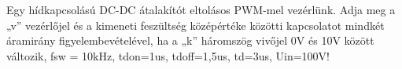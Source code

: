 \begin{example}

Egy hídkapcsolású DC-DC átalakítót eltolásos PWM-mel vezérlünk. Adja meg a „v” vezérlőjel és a kimeneti feszültség középértéke közötti kapcsolatot mindkét áramirány figyelembevételével, ha a „k” háromszög vivőjel 0V és 10V között változik, fsw = 10kHz, tdon=1us, tdoff=1,5us, td=3us, Uin=100V! 

\tcbline
\vspace{1mm}

\solution

\end{example}